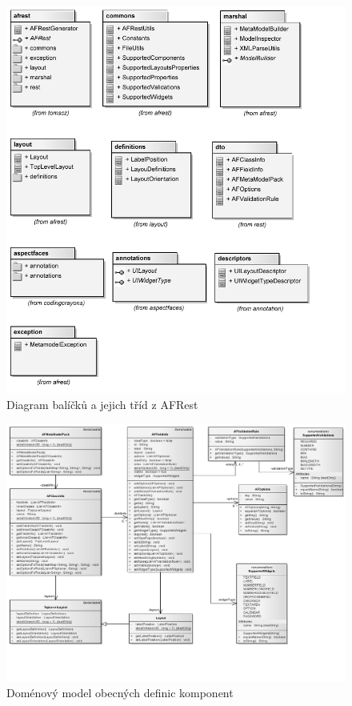 \documentclass[11pt,twoside,a4paper]{book}
\begin{document}
\begin{figure}
\begin{center}
\includegraphics{images/serverSide}
\caption{Diagram balíčků a jejich tříd z AFRest}
\label{img:serverSide}
\end{center}
\end{figure}

\begin{figure}
\includegraphics[angle=270]{images/metaModelFinal}
\caption{Doménový model obecných definic komponent}
\label{	img:metaModelFinal}
\end{figure}	
\end{document}
